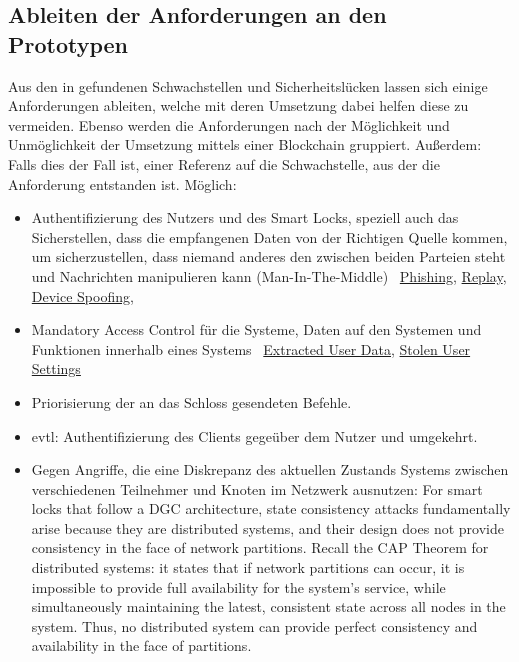 \subsection{Ableiten der Anforderungen an den Prototypen}
\label{sec:analysis_requirements}

    Aus den in  gefundenen Schwachstellen und Sicherheitslücken lassen sich einige Anforderungen ableiten, welche mit deren Umsetzung dabei helfen diese zu vermeiden.
    Ebenso werden die Anforderungen nach der Möglichkeit und Unmöglichkeit der Umsetzung mittels einer Blockchain gruppiert.
    Außerdem: Falls dies der Fall ist, einer Referenz auf die Schwachstelle, aus der die Anforderung entstanden ist.
    \noindent Möglich:
    \begin{itemize}
        \item Authentifizierung des Nutzers und des Smart Locks, speziell auch das Sicherstellen, dass die empfangenen Daten von der Richtigen Quelle kommen, um sicherzustellen, dass niemand anderes den zwischen beiden Parteien steht und Nachrichten manipulieren kann (Man-In-The-Middle) \textrightarrow\ \hyperref[vuln:phishing]{Phishing}, \hyperref[vuln:replay]{Replay}, \hyperref[vuln:spoofing]{Device Spoofing}, 
        \item Mandatory Access Control für die Systeme, Daten auf den Systemen und Funktionen innerhalb eines Systems \textrightarrow\ \hyperref[vuln:user_data]{Extracted User Data}, \hyperref[vuln:user_settings]{Stolen User Settings}
        \item Priorisierung der an das Schloss gesendeten Befehle\cite{Ye2017}.
        \item evtl: Authentifizierung des Clients gegeüber dem Nutzer und umgekehrt.\cite{Ye2017}
        \item Gegen Angriffe, die eine Diskrepanz des aktuellen Zustands Systems zwischen verschiedenen Teilnehmer und Knoten im Netzwerk ausnutzen: 
        For smart locks that follow a DGC architecture, state consistency attacks fundamentally arise because they are distributed systems, and their design does not provide consistency in the face of network partitions. Recall the CAP Theorem for distributed systems: it states that if network partitions can occur, it is impossible to provide full availability for the system's service, while simultaneously maintaining the latest, consistent state across all nodes in the system.
        Thus, no distributed system can provide perfect consistency and availability in the face of partitions.\cite{Ho2016} \\

\end{itemize}
